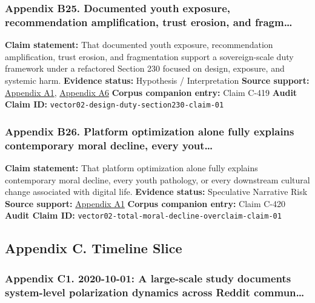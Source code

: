 \documentclass[
  american,
  11pt,
  letterpaper,
]{article}
\begin{document}
\subsubsection{Appendix B25. Documented youth exposure, recommendation
amplification, trust erosion, and
fragm\ldots{}}\label{appendix-b25-documented-youth-exposure-recommendation-amplification-trust-erosion-and-fragm}

\textbf{Claim statement:} That documented youth exposure, recommendation
amplification, trust erosion, and fragmentation support a
sovereign-scale duty framework under a refactored Section 230 focused on
design, exposure, and systemic harm. \textbf{Evidence status:}
Hypothesis / Interpretation \textbf{Source support:}
\hyperref[appendix-a1-social-media-and-youth-mental-health-the-u-s-surgeon-general-s-advisory]{Appendix
A1},
\hyperref[appendix-a6-social-media-seen-as-mostly-good-for-democracy-across-many-nations-but-u-s-is-a-major-outlier]{Appendix
A6} \textbf{Corpus companion entry:} Claim C-419 \textbf{Audit Claim
ID:} \texttt{vector02-design-duty-section230-claim-01}

\subsubsection{Appendix B26. Platform optimization alone fully explains
contemporary moral decline, every
yout\ldots{}}\label{appendix-b26-platform-optimization-alone-fully-explains-contemporary-moral-decline-every-yout}

\textbf{Claim statement:} That platform optimization alone fully
explains contemporary moral decline, every youth pathology, or every
downstream cultural change associated with digital life.
\textbf{Evidence status:} Speculative Narrative Risk \textbf{Source
support:}
\hyperref[appendix-a1-social-media-and-youth-mental-health-the-u-s-surgeon-general-s-advisory]{Appendix
A1} \textbf{Corpus companion entry:} Claim C-420 \textbf{Audit Claim
ID:} \texttt{vector02-total-moral-decline-overclaim-claim-01}

\subsection{Appendix C. Timeline
Slice}\label{appendix-c.-timeline-slice}

\subsubsection{Appendix C1. 2020-10-01: A large-scale study documents
system-level polarization dynamics across Reddit
commun\ldots{}}\label{appendix-c1-2020-10-01-a-large-scale-study-documents-system-level-polarization-dynamics-across-reddit-communities}
\end{document}
